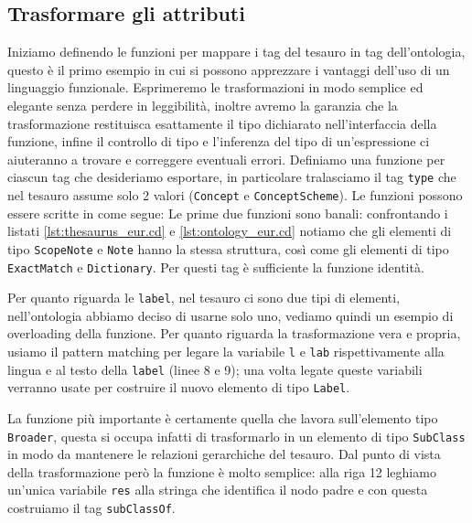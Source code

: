 \subsection{Trasformare gli attributi}
Iniziamo definendo le funzioni per mappare i tag del tesauro in tag dell'ontologia, questo è il primo esempio in cui si possono apprezzare i vantaggi dell'uso di un linguaggio funzionale. Esprimeremo le trasformazioni in modo semplice ed elegante senza perdere in leggibilità, inoltre avremo la garanzia che la trasformazione restituisca esattamente il tipo dichiarato nell'interfaccia della funzione, infine il controllo di tipo e l'inferenza del tipo di un'espressione ci aiuteranno a trovare e correggere eventuali errori. Definiamo una funzione per ciascun tag che desideriamo esportare, in particolare tralasciamo il tag \verb|type| che nel tesauro assume solo 2 valori (\verb|Concept| e \verb|ConceptScheme|). Le funzioni possono essere scritte in \cduce come segue:
Le prime due funzioni sono banali: confrontando i listati \ref{lst:thesaurus_eur.cd} e \ref{lst:ontology_eur.cd} notiamo che gli elementi di tipo \verb|ScopeNote| e \verb|Note| hanno la stessa struttura, così come gli elementi di tipo \verb|ExactMatch| e \verb|Dictionary|. Per questi tag è sufficiente la funzione identità.

Per quanto riguarda le \verb|label|, nel tesauro ci sono due tipi di elementi, nell'ontologia abbiamo deciso di usarne solo uno, vediamo quindi un esempio di overloading della funzione. Per quanto riguarda la trasformazione vera e propria, usiamo il pattern matching per legare la variabile \verb|l| e \verb|lab| rispettivamente alla lingua e al testo della \verb|label| (linee 8 e 9); una volta legate queste variabili verranno usate per costruire il nuovo elemento di tipo \verb|Label|.

La funzione più importante è certamente quella che lavora sull'elemento tipo \verb|Broader|, questa si occupa infatti di trasformarlo in un elemento di tipo \verb|SubClass| in modo da mantenere le relazioni gerarchiche del tesauro. Dal punto di vista della trasformazione però la funzione è molto semplice: alla riga 12 leghiamo un'unica variabile \verb|res| alla stringa che identifica il nodo padre e con questa costruiamo il tag \verb|subClassOf|.
